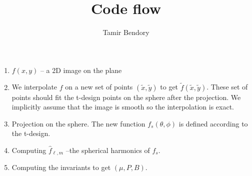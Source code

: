 \documentclass[journal]{article}
\numberwithin{equation}{section}
\theoremstyle{plain}
\theoremstyle{definition}
\theoremstyle{remark}
\theoremstyle{plain}
\theoremstyle{remark}
\theoremstyle{plain}
\theoremstyle{plain}
\begin{document}


\title{Code flow}

\author{Tamir Bendory}
\maketitle

\begin{enumerate}
	
	\item $f(x,y)$ -- a 2D image on the plane
	\item We interpolate $f$ on a new set of points $(\tilde{x},\tilde{y})$ to get $\tilde{f}(\tilde{x},\tilde{y})$. These set of points should fit the t-design points on the sphere after the projection. We implicitly assume that the image is smooth so the interpolation is exact. 
	\item  Projection on the sphere. The new function $f_s(\theta,\phi)$  is defined according to the t-design.
	\item  Computing $\hat{f}_{\ell,m}$  --the spherical harmonics of $f_s$.
	\item  Computing the invariants to get $(\mu,P,B)$.
\end{enumerate}
\end{document}
